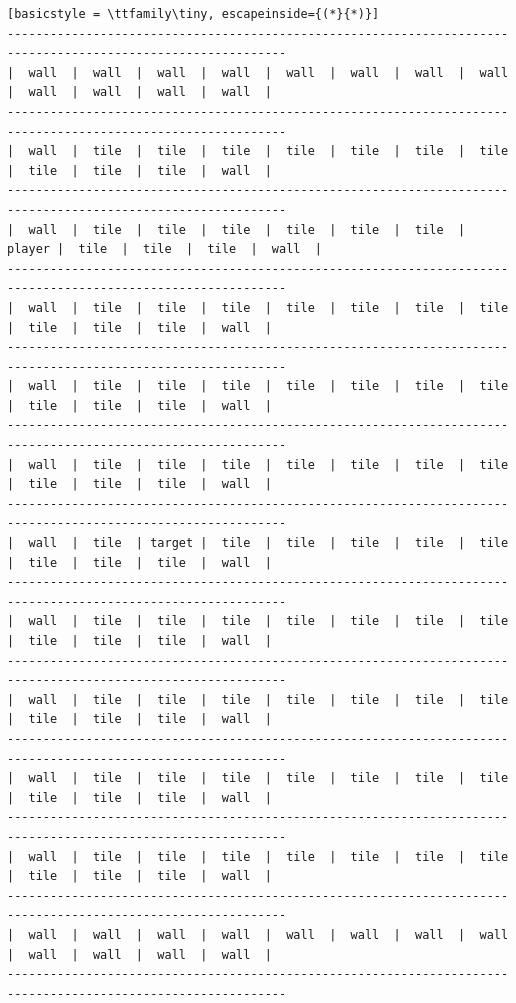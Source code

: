 \begin{lstlisting}[basicstyle = \ttfamily\tiny, escapeinside={(*}{*)}]
-------------------------------------------------------------------------------------------------------------
|  wall  |  wall  |  wall  |  wall  |  wall  |  wall  |  wall  |  wall  |  wall  |  wall  |  wall  |  wall  |
-------------------------------------------------------------------------------------------------------------
|  wall  |  tile  |  tile  |  tile  |  tile  |  tile  |  tile  |  tile  |  tile  |  tile  |  tile  |  wall  |
-------------------------------------------------------------------------------------------------------------
|  wall  |  tile  |  tile  |  tile  |  tile  |  tile  |  tile  | player |  tile  |  tile  |  tile  |  wall  |
-------------------------------------------------------------------------------------------------------------
|  wall  |  tile  |  tile  |  tile  |  tile  |  tile  |  tile  |  tile  |  tile  |  tile  |  tile  |  wall  |
-------------------------------------------------------------------------------------------------------------
|  wall  |  tile  |  tile  |  tile  |  tile  |  tile  |  tile  |  tile  |  tile  |  tile  |  tile  |  wall  |
-------------------------------------------------------------------------------------------------------------
|  wall  |  tile  |  tile  |  tile  |  tile  |  tile  |  tile  |  tile  |  tile  |  tile  |  tile  |  wall  |
-------------------------------------------------------------------------------------------------------------
|  wall  |  tile  | target |  tile  |  tile  |  tile  |  tile  |  tile  |  tile  |  tile  |  tile  |  wall  |
-------------------------------------------------------------------------------------------------------------
|  wall  |  tile  |  tile  |  tile  |  tile  |  tile  |  tile  |  tile  |  tile  |  tile  |  tile  |  wall  |
-------------------------------------------------------------------------------------------------------------
|  wall  |  tile  |  tile  |  tile  |  tile  |  tile  |  tile  |  tile  |  tile  |  tile  |  tile  |  wall  |
-------------------------------------------------------------------------------------------------------------
|  wall  |  tile  |  tile  |  tile  |  tile  |  tile  |  tile  |  tile  |  tile  |  tile  |  tile  |  wall  |
-------------------------------------------------------------------------------------------------------------
|  wall  |  tile  |  tile  |  tile  |  tile  |  tile  |  tile  |  tile  |  tile  |  tile  |  tile  |  wall  |
-------------------------------------------------------------------------------------------------------------
|  wall  |  wall  |  wall  |  wall  |  wall  |  wall  |  wall  |  wall  |  wall  |  wall  |  wall  |  wall  |
-------------------------------------------------------------------------------------------------------------
\end{lstlisting}